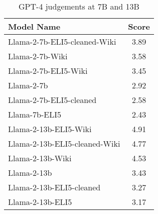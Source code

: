 \documentclass[11pt, oneside]{article}   	%
\begin{document}
\begin{table}[h]
\centering
\begin{tabular}{|l|c|}
\hline
Model Name & Score \\
\hline
Llama-2-7b-ELI5-cleaned-Wiki & 3.89 \\
Llama-2-7b-Wiki & 3.58 \\
Llama-2-7b-ELI5-Wiki & 3.45 \\
Llama-2-7b & 2.92 \\
Llama-2-7b-ELI5-cleaned & 2.58 \\
Llama-7b-ELI5 & 2.43 \\
\hline\hline 
Llama-2-13b-ELI5-Wiki & 4.91 \\
Llama-2-13b-ELI5-cleaned-Wiki & 4.77 \\
Llama-2-13b-Wiki & 4.53 \\
Llama-2-13b & 3.43 \\
Llama-2-13b-ELI5-cleaned & 3.27 \\
Llama-2-13b-ELI5 & 3.17 \\
\hline
\end{tabular}
\caption{GPT-4 judgements at 7B and 13B}
\end{table}
\end{document}
